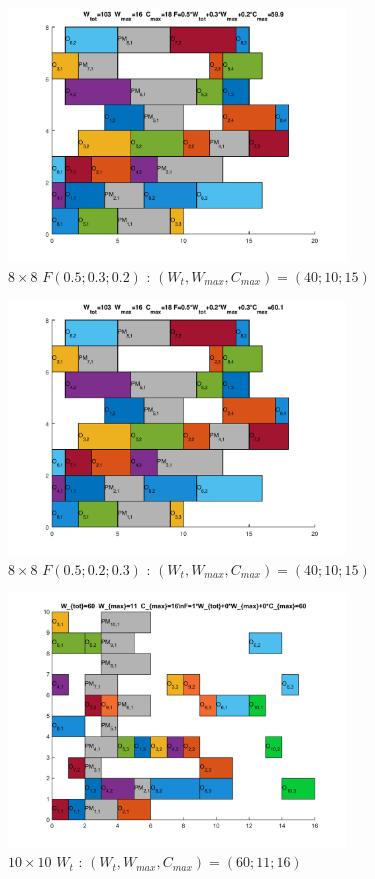\documentclass[10pt,a4paper]{scrartcl}
\begin{document}
\begin{figure}
  \centering
  \includegraphics[width=0.8\textwidth]{img/results8x8_F050302.png}
  \caption{$8 \times 8$ $F(0.5;0.3;0.2)$ : $(W_t, W_{max}, C_{max}) = (40; 10; 15)$}
\end{figure}
\begin{figure}
  \centering
  \includegraphics[width=0.8\textwidth]{img/results8x8_F050203.png}
  \caption{$8 \times 8$ $F(0.5;0.2;0.3)$ : $(W_t, W_{max}, C_{max}) = (40; 10; 15)$}
\end{figure}
\begin{figure}
  \centering
  \includegraphics[width=0.8\textwidth]{img/results10x10_Wtot.png}
  \caption{$10 \times 10$ $W_{t}$ : $(W_t, W_{max}, C_{max}) = (60; 11; 16)$}
\end{figure}
\end{document}
